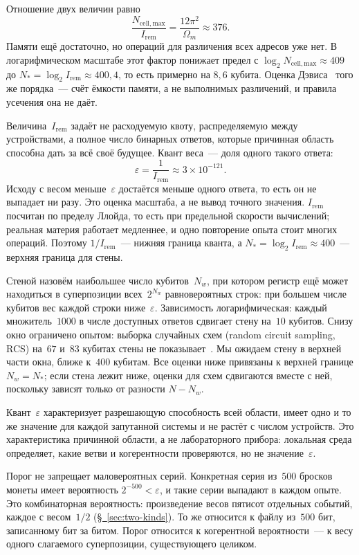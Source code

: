 \documentclass[11pt,a4paper]{article}
\newcommand{\Ost}{I_{\mathrm{rem}}}
\begin{document}
Отношение двух величин равно
\[
\frac{N_{\mathrm{cell,max}}}{\Ost}
=\frac{12\pi^2}{\Omega_m}
\approx 376.
\]
Памяти ещё достаточно, но операций для различения всех адресов уже нет. В логарифмическом масштабе этот фактор понижает предел с $\log_2 N_{\mathrm{cell,max}}\approx 409$ до $N_*=\log_2\Ost\approx 400{,}4$, то есть примерно на $8{,}6$ кубита. Оценка Дэвиса~\cite{davies2007} того же порядка~--- счёт ёмкости памяти, а не выполнимых различений, и правила усечения она не даёт.

Величина~$\Ost$ задаёт не расходуемую квоту, распределяемую между устройствами, а полное число бинарных ответов, которые причинная область способна дать за всё своё будущее. Квант веса~--- доля одного такого ответа:
\begin{equation}
\varepsilon = \frac{1}{\Ost}\approx 3\times 10^{-121}.
\end{equation}
Исходу с весом меньше~$\varepsilon$ достаётся меньше одного ответа, то есть он не выпадает ни разу. Это оценка масштаба, а не вывод точного значения. $\Ost$ посчитан по пределу Ллойда, то есть при предельной скорости вычислений; реальная материя работает медленнее, и одно повторение опыта стоит многих операций. Поэтому $1/\Ost$~--- нижняя граница кванта, а $N_*=\log_2\Ost\approx400$~--- верхняя граница для стены.

Стеной назовём наибольшее число кубитов~$N_w$, при котором регистр ещё может находиться в суперпозиции всех~$2^{N_w}$ равновероятных строк: при большем числе кубитов вес каждой строки ниже~$\varepsilon$. Зависимость логарифмическая: каждый множитель~$1000$ в числе доступных ответов сдвигает стену на~$10$ кубитов. Снизу окно ограничено опытом: выборка случайных схем (random circuit sampling, RCS) на~$67$ и~$83$ кубитах стены не показывает~\cite{morvan2024,gao2025}. Мы ожидаем стену в верхней части окна, ближе к~$400$ кубитам. Все оценки ниже привязаны к верхней границе $N_w=N_*$; если стена лежит ниже, оценки для схем сдвигаются вместе с ней, поскольку зависят только от разности $N-N_w$.

Квант~$\varepsilon$ характеризует разрешающую способность всей области, имеет одно и то же значение для каждой запутанной системы и не растёт с числом устройств. Это характеристика причинной области, а не лабораторного прибора: локальная среда определяет, какие ветви и когерентности проверяются, но не значение~$\varepsilon$.

Порог не запрещает маловероятных серий. Конкретная серия из~$500$ бросков монеты имеет вероятность $2^{-500}<\varepsilon$, и такие серии выпадают в каждом опыте. Это комбинаторная вероятность: произведение весов пятисот отдельных событий, каждое с весом~$1/2$ (\hyperref[sec:two-kinds]{\S~\ref*{sec:two-kinds}}). То же относится к файлу из~$500$ бит, записанному бит за битом. Порог относится к когерентной вероятности~--- к весу одного слагаемого суперпозиции, существующего целиком.
\end{document}
